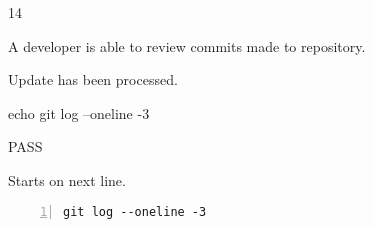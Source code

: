 \begin{description}[align=right,leftmargin=3.2cm,labelindent=3.0cm]
\item[Step:] 14
\item[Confirm:] A developer is able to review commits made to repository.
\item[Expectation:] Update has been processed.
\item[Command:] echo git  log --oneline -3
\item[Test Result:] PASS
\item[Evidence:] Starts on next line.
\end{description}
\begin{lstlisting}[numbers=left]
git log --oneline -3

\end{lstlisting}
